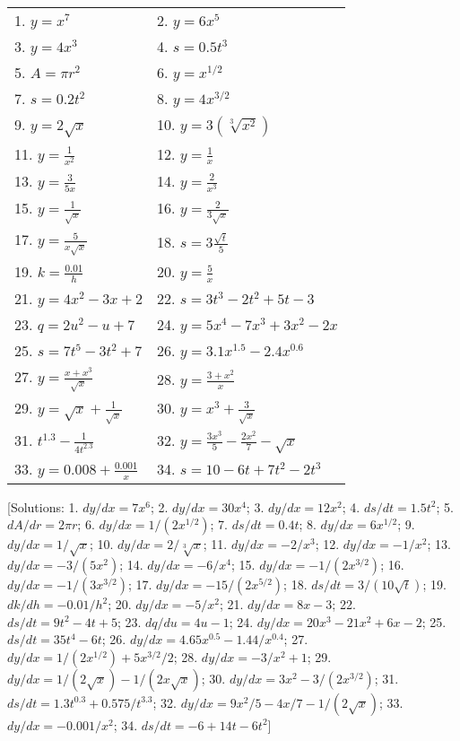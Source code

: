 \documentclass[
  11pt,
  oneside]{book}
\newcommand{\slide}{}
\theoremstyle{definition}
\theoremstyle{definition}
\theoremstyle{definition}
\theoremstyle{definition}
\theoremstyle{remark}
\begin{document}
\begin{tabular}{l|l}
\hline
 & \\
\hline
1. $y=x^7$ & 2. $y=6x^5$\\
\hline
3. $y=4x^3$ & 4. $s=0.5t^3$\\
\hline
5. $A=\pi r^2$ & 6. $y=x^{1/2}$\\
\hline
7. $s=0.2t^2$ & 8. $y=4x^{3/2}$\\
\hline
9. $y=2\sqrt{x}$ & 10. $y=3(\sqrt[3]{x^2})$\\
\hline
11. $y=\frac1{x^2}$ & 12. $y=\frac 1x$\\
\hline
13. $y=\frac3{5x}$ & 14. $y=\frac2{x^3}$\\
\hline
15. $y=\frac1{\sqrt{x}}$ & 16. $y=\frac2{3\sqrt{x}}$\\
\hline
17. $y=\frac5{x\sqrt{x}}$ & 18. $s=3\frac{\sqrt{t}}5$\\
\hline
19. $k=\frac{0.01}{h}$ & 20. $y=\frac5x$\\
\hline
21. $y=4x^2-3x+2$ & 22. $s=3t^3-2t^2+5t-3$\\
\hline
23. $q=2u^2-u+7$ & 24. $y=5x^4-7x^3+3x^2-2x$\\
\hline
25. $s=7t^5-3t^2+7$ & 26. $y=3.1x^{1.5}-2.4x^{0.6}$\\
\hline
27. $y=\frac{x+x^3}{\sqrt{x}}$ & 28. $y=\frac{3+x^2}x$\\
\hline
29. $y=\sqrt{x}+\frac1{\sqrt{x}}$ & 30. $y=x^3+\frac3{\sqrt{x}}$\\
\hline
31. $t^{1.3}-\frac1{4t^{2.3}}$ & 32. $y=\frac{3x^3}5-\frac{2x^2}7-\sqrt{x}$\\
\hline
33. $y=0.008+\frac{0.001}{x}$ & 34. $s=10-6t+7t^2-2t^3$\\
\hline
\end{tabular}
\slide

{[}Solutions: 1. \(dy/dx=7x^6\); 2. \(dy/dx=30x^4\); 3. \(dy/dx=12x^2\); 4. \(ds/dt=1.5t^2\); 5. \(dA/dr=2\pi r\); 6. \(dy/dx=1/(2x^{1/2})\); 7. \(ds/dt=0.4t\); 8. \(dy/dx=6x^{1/2}\); 9. \(dy/dx=1/\sqrt{x}\); 10. \(dy/dx=2/\sqrt[3]{x}\); 11. \(dy/dx=-2/x^3\); 12. \(dy/dx=-1/x^2\); 13. \(dy/dx=-3/(5x^2)\); 14. \(dy/dx=-6/x^4\); 15. \(dy/dx=-1/(2x^{3/2})\); 16. \(dy/dx=-1/(3x^{3/2})\); 17. \(dy/dx=-15/(2x^{5/2})\); 18. \(ds/dt=3/(10\sqrt{t})\); 19. \(dk/dh=-0.01/h^2\); 20. \(dy/dx=-5/x^2\); 21. \(dy/dx=8x-3\); 22. \(ds/dt=9t^2-4t+5\); 23. \(dq/du=4u-1\); 24. \(dy/dx=20x^3-21x^2+6x-2\); 25. \(ds/dt=35t^4-6t\); 26. \(dy/dx=4.65x^{0.5}-1.44/x^{0.4}\); 27. \(dy/dx=1/(2x^{1/2})+5x^{3/2}/2\); 28. \(dy/dx=-3/x^2+1\); 29. \(dy/dx=1/(2\sqrt{x})-1/(2x\sqrt{x})\); 30. \(dy/dx=3x^2-3/(2x^{3/2})\); 31. \(ds/dt=1.3t^{0.3}+0.575/t^{3.3}\); 32. \(dy/dx=9x^2/5-4x/7-1/(2\sqrt{x})\); 33. \(dy/dx=-0.001/x^2\); 34. \(ds/dt=-6+14t-6t^2\){]}
\end{document}
